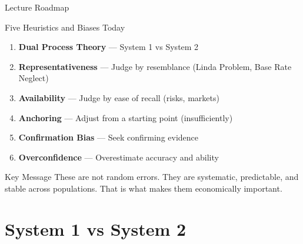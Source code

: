 \documentclass[aspectratio=169]{beamer}
\begin{document}
\begin{frame}{Lecture Roadmap}
\begin{block}{Five Heuristics and Biases Today}
\begin{enumerate}
  \item \textbf{Dual Process Theory} --- System 1 vs System 2
  \item \textbf{Representativeness} --- Judge by resemblance (Linda Problem, Base Rate Neglect)
  \item \textbf{Availability} --- Judge by ease of recall (risks, markets)
  \item \textbf{Anchoring} --- Adjust from a starting point (insufficiently)
  \item \textbf{Confirmation Bias} --- Seek confirming evidence
  \item \textbf{Overconfidence} --- Overestimate accuracy and ability
\end{enumerate}
\end{block}
\begin{exampleblock}{Key Message}
These are not random errors. They are \alert{systematic, predictable, and stable across populations}. That is what makes them economically important.
\end{exampleblock}
\end{frame}

\section{System 1 vs System 2}
\end{document}
